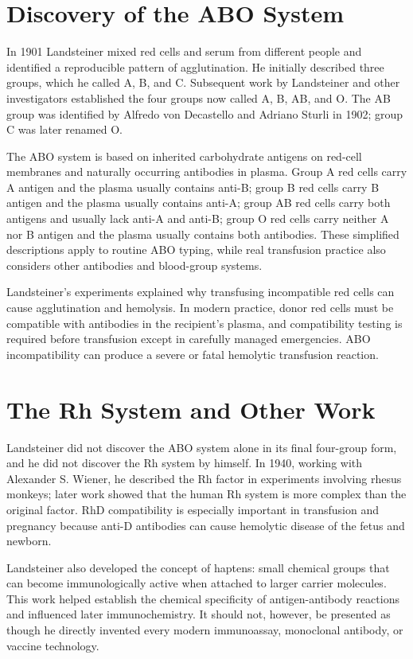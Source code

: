 \section{Discovery of the ABO System}

In 1901 Landsteiner mixed red cells and serum from different people and identified a reproducible pattern of agglutination. He initially described three groups, which he called A, B, and C. Subsequent work by Landsteiner and other investigators established the four groups now called A, B, AB, and O. The AB group was identified by Alfredo von Decastello and Adriano Sturli in 1902; group C was later renamed O.

The ABO system is based on inherited carbohydrate antigens on red-cell membranes and naturally occurring antibodies in plasma. Group A red cells carry A antigen and the plasma usually contains anti-B; group B red cells carry B antigen and the plasma usually contains anti-A; group AB red cells carry both antigens and usually lack anti-A and anti-B; group O red cells carry neither A nor B antigen and the plasma usually contains both antibodies. These simplified descriptions apply to routine ABO typing, while real transfusion practice also considers other antibodies and blood-group systems.

Landsteiner's experiments explained why transfusing incompatible red cells can cause agglutination and hemolysis. In modern practice, donor red cells must be compatible with antibodies in the recipient's plasma, and compatibility testing is required before transfusion except in carefully managed emergencies. ABO incompatibility can produce a severe or fatal hemolytic transfusion reaction.

\section{The Rh System and Other Work}

Landsteiner did not discover the ABO system alone in its final four-group form, and he did not discover the Rh system by himself. In 1940, working with Alexander S. Wiener, he described the Rh factor in experiments involving rhesus monkeys; later work showed that the human Rh system is more complex than the original factor. RhD compatibility is especially important in transfusion and pregnancy because anti-D antibodies can cause hemolytic disease of the fetus and newborn.

Landsteiner also developed the concept of haptens: small chemical groups that can become immunologically active when attached to larger carrier molecules. This work helped establish the chemical specificity of antigen-antibody reactions and influenced later immunochemistry. It should not, however, be presented as though he directly invented every modern immunoassay, monoclonal antibody, or vaccine technology.

